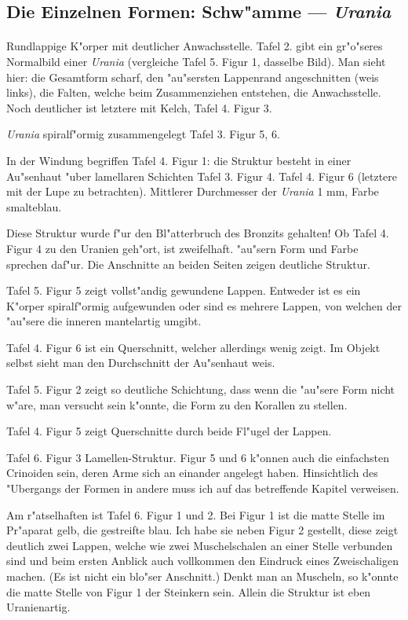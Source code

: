 \documentclass[a4paper, 11pt, oneside]{article}
\begin{document}
\subsection{Die Einzelnen Formen: Schw"amme --- \emph{Urania}}
\paragraph{}
Rundlappige K"orper mit deutlicher Anwachsstelle. Tafel 2. gibt ein gr"o"seres Normalbild einer \emph{Urania} (vergleiche Tafel 5. Figur 1, dasselbe Bild). Man sieht hier: die Gesamtform scharf, den "au"sersten Lappenrand angeschnitten (weis links), die Falten, welche beim Zusammenziehen entstehen, die Anwachsstelle. Noch deutlicher ist letztere mit Kelch, Tafel 4. Figur 3.

\emph{Urania} spiralf"ormig zusammengelegt Tafel 3. Figur 5, 6.

In der Windung begriffen Tafel 4. Figur 1: die Struktur besteht in einer Au"senhaut "uber lamellaren Schichten Tafel 3. Figur 4. Tafel 4. Figur 6 (letztere mit der Lupe zu betrachten). Mittlerer Durchmesser der \emph{Urania} 1 mm, Farbe smalteblau.

Diese Struktur wurde f"ur den Bl"atterbruch des Bronzits gehalten! Ob Tafel 4. Figur 4 zu den Uranien geh"ort, ist zweifelhaft. "au"sern Form und Farbe sprechen daf"ur. Die Anschnitte an beiden Seiten zeigen deutliche Struktur.

Tafel 5. Figur 5 zeigt vollst"andig gewundene Lappen. Entweder ist es ein K"orper spiralf"ormig aufgewunden oder sind es mehrere Lappen, von welchen der "au"sere die inneren mantelartig umgibt.

Tafel 4. Figur 6 ist ein Querschnitt, welcher allerdings wenig zeigt. Im Objekt selbst sieht man den Durchschnitt der Au"senhaut weis.

Tafel 5. Figur 2 zeigt so deutliche Schichtung, dass wenn die "au"sere Form nicht w"are, man versucht sein k"onnte, die Form zu den Korallen zu stellen.

Tafel 4. Figur 5 zeigt Querschnitte durch beide Fl"ugel der Lappen.

Tafel 6. Figur 3 Lamellen-Struktur. Figur 5 und 6 k"onnen auch die einfachsten Crinoiden sein, deren Arme sich an einander angelegt haben. Hinsichtlich des "Ubergangs der Formen in andere muss ich auf das betreffende Kapitel verweisen.

Am r"atselhaften ist Tafel 6. Figur 1 und 2. Bei Figur 1 ist die matte Stelle im Pr"aparat gelb, die gestreifte blau. Ich habe sie neben Figur 2 gestellt, diese zeigt deutlich zwei Lappen, welche wie zwei Muschelschalen an einer Stelle verbunden sind und beim ersten Anblick auch vollkommen den Eindruck eines Zweischaligen machen. (Es ist nicht ein blo"ser Anschnitt.) Denkt man an Muscheln, so k"onnte die matte Stelle von Figur 1 der Steinkern sein. Allein die Struktur ist eben Uranienartig.
\end{document}
